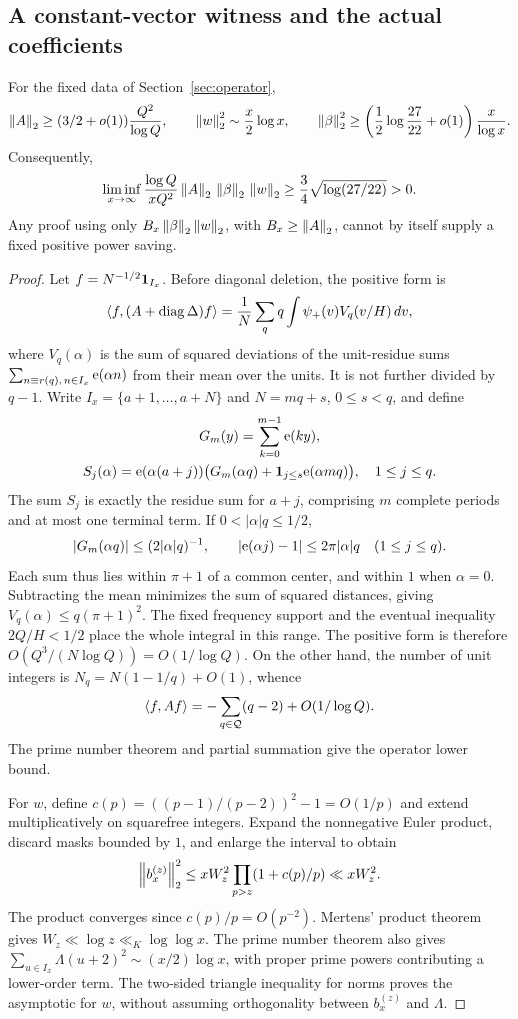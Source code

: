 \subsection{A constant-vector witness and the actual coefficients}
\begin{theorem}\label{thm:normbarrier}
For the fixed data of Section~\ref{sec:operator},
\[
\left\|A\right\|_2\ge(3/2+o(1))\frac{Q^2}{\log Q},\qquad
\left\|w\right\|_2^2\sim\frac x2\log x,\qquad
\left\|\beta\right\|_2^2\ge\left(\frac12\log\frac{27}{22}+o(1)\right)\frac x{\log x}.
\]
Consequently,
\[
\liminf_{x\to\infty}\frac{\log Q}{xQ^2}\left\|A\right\|_2\,\left\|\beta\right\|_2\,\left\|w\right\|_2
\ge\frac34\sqrt{\log(27/22)}>0.
\]
Any proof using only $B_x\left\|\beta\right\|_2\left\|w\right\|_2$, with $B_x\ge\left\|A\right\|_2$, cannot by itself supply a fixed positive power saving.
\end{theorem}
\begin{proof}
Let $f=N^{-1/2}\mathbf 1_{I_x}$. Before diagonal deletion, the positive form is
\[
\langle f,(A+\operatorname{diag}\Delta)f\rangle=\frac1N\sum_q q\int\psi_+(v)V_q(v/H)\,dv,
\]
where $V_q(\alpha)$ is the sum of squared deviations of the unit-residue sums
$\sum_{n\equiv r(q),\,n\in I_x}\mathrm e(\alpha n)$ from their mean over the units. It is not further divided by $q-1$. Write
$I_x=\{a+1,\ldots,a+N\}$ and $N=mq+s$, $0\le s<q$, and define
\[
\begin{gathered}
G_m(y)=\sum_{k=0}^{m-1}\mathrm e(ky),\\
S_j(\alpha)=\mathrm e(\alpha(a+j))\bigl(G_m(\alpha q)+\mathbf 1_{j\le s}\mathrm e(\alpha mq)\bigr),
\quad1\le j\le q.
\end{gathered}
\]
The sum $S_j$ is exactly the residue sum for $a+j$, comprising $m$ complete periods and at most one terminal term. If $0<|\alpha|q\le1/2$,
\[
|G_m(\alpha q)|\le(2|\alpha|q)^{-1},\qquad
|\mathrm e(\alpha j)-1|\le2\pi|\alpha|q\quad(1\le j\le q).
\]
Each sum thus lies within $\pi+1$ of a common center, and within $1$ when $\alpha=0$. Subtracting the mean minimizes the sum of squared distances, giving $V_q(\alpha)\le q(\pi+1)^2$. The fixed frequency support and the eventual inequality $2Q/H<1/2$ place the whole integral in this range. The positive form is therefore
$O(Q^3/(N\log Q))=O(1/\log Q)$.
On the other hand, the number of unit integers is $N_q=N(1-1/q)+O(1)$, whence
\[
\langle f,Af\rangle=-\sum_{q\in\mathcal Q}(q-2)+O(1/\log Q).
\]
The prime number theorem and partial summation give the operator lower bound.

For $w$, define $c(p)=((p-1)/(p-2))^2-1=O(1/p)$ and extend multiplicatively on squarefree integers. Expand the nonnegative Euler product, discard masks bounded by $1$, and enlarge the interval to obtain
\[
\left\|b_x^{(z)}\right\|_2^2\le xW_z^2\prod_{p>z}(1+c(p)/p)\ll xW_z^2.
\]
The product converges since $c(p)/p=O(p^{-2})$. Mertens' product theorem gives
$W_z\ll\log z\ll_K\log\log x$. The prime number theorem also gives
$\sum_{u\in I_x}\Lambda(u+2)^2\sim(x/2)\log x$, with proper prime powers contributing a lower-order term. The two-sided triangle inequality for norms proves the asymptotic for $w$, without assuming orthogonality between $b_x^{(z)}$ and $\Lambda$.


\end{proof}
